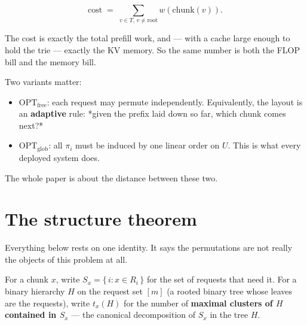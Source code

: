 \documentclass[11pt]{article}
\theoremstyle{plain}
\begin{document}
\[
\mathrm{cost} \;=\; \sum_{v \in T,\, v \neq \text{root}} w(\mathrm{chunk}(v)).
\]

The cost is exactly the total prefill work, and --- with a cache large enough to hold the trie --- exactly the KV memory. So the same number is both the FLOP bill and the memory bill.

Two variants matter:

\begin{itemize}
\item $\mathrm{OPT}_{\mathrm{free}}$: each request may permute independently. Equivalently, the layout is an \textbf{adaptive} rule: *given the prefix laid down so far, which chunk comes next?*
\item $\mathrm{OPT}_{\mathrm{glob}}$: all $\pi_i$ must be induced by one linear order on $U$. This is what every deployed system does.
\end{itemize}

The whole paper is about the distance between these two.


\section{The structure theorem}

Everything below rests on one identity. It says the permutations are not really the objects of this problem at all.

For a chunk $x$, write $S_x = \{\, i : x \in R_i \,\}$ for the set of requests that need it. For a binary hierarchy $H$ on the request set $[m]$ (a rooted binary tree whose leaves are the requests), write $t_x(H)$ for the number of \textbf{maximal clusters of $H$ contained in $S_x$} --- the canonical decomposition of $S_x$ in the tree $H$.
\end{document}
